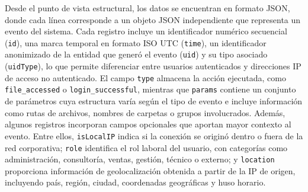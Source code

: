 Desde el punto de vista estructural, los datos se encuentran en formato JSON, donde cada línea corresponde a un objeto JSON independiente que representa un evento del sistema. Cada registro incluye un identificador numérico secuencial (\texttt{id}), una marca temporal en formato ISO UTC (\texttt{time}), un identificador anonimizado de la entidad que generó el evento (\texttt{uid}) y su tipo asociado (\texttt{uidType}), lo que permite diferenciar entre usuarios autenticados y direcciones IP de acceso no autenticado. El campo \texttt{type} almacena la acción ejecutada, como \texttt{file\_accessed} o \texttt{login\_successful}, mientras que \texttt{params} contiene un conjunto de parámetros cuya estructura varía según el tipo de evento e incluye información como rutas de archivos, nombres de carpetas o grupos involucrados. Además, algunos registros incorporan campos opcionales que aportan mayor contexto al evento. Entre ellos, \texttt{isLocalIP} indica si la conexión se originó dentro o fuera de la red corporativa; \texttt{role} identifica el rol laboral del usuario, con categorías como administración, consultoría, ventas, gestión, técnico o externo; y \texttt{location} proporciona información de geolocalización obtenida a partir de la IP de origen, incluyendo país, región, ciudad, coordenadas geográficas y huso horario.
